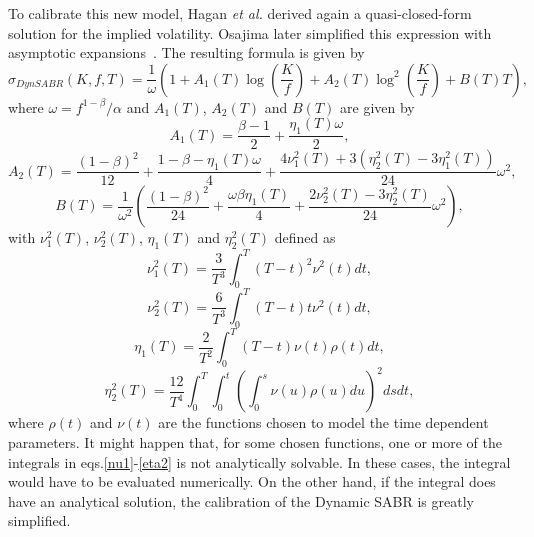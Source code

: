 To calibrate this new model, Hagan \textit{et al.} derived again a quasi-closed-form solution for the implied volatility. Osajima later simplified this expression with asymptotic expansions~\cite{Osajima}. The resulting formula is given by
\begin{equation}
\sigma_{DynSABR}(K,f,T)=\frac{1}{\omega}\left(1+A_1(T)\log\left(\frac{K}{f}\right)+A_2(T)\log^2\left(\frac{K}{f}\right)+B(T)T\right),
\end{equation}
\noindent where $\omega=f^{1-\beta}/\alpha$ and $A_1(T)$, $A_2(T)$ and $B(T)$ are given by
\begin{equation}
A_1(T)=\frac{\beta-1}{2}+\frac{\eta_1(T)\omega}{2},
\end{equation}
\begin{equation}
A_2(T)=\frac{(1-\beta)^2}{12}+\frac{1-\beta-\eta_1(T)\omega}{4}+\frac{4\nu_1^2(T)+3(\eta_2^2(T)-3\eta_1^2(T))}{24}\omega^2,
\end{equation}
\begin{equation}
B(T)=\frac{1}{\omega^2}\left(\frac{(1-\beta)^2}{24}+\frac{\omega\beta\eta_1(T)}{4}+\frac{2\nu_2^2(T)-3\eta_2^2(T)}{24}\omega^2\right),
\end{equation}
\noindent with $\nu_1^2(T)$, $\nu_2^2(T)$, $\eta_1(T)$ and $\eta_2^2(T)$ defined as
\begin{equation}\label{nu1}
\nu_1^2(T)=\frac{3}{T^3}\int_0^T(T-t)^2\nu^2(t)dt,
\end{equation}
\begin{equation}
\nu_2^2(T)=\frac{6}{T^3}\int_0^T(T-t)t\nu^2(t)dt,
\end{equation}
\begin{equation}
\eta_1(T)=\frac{2}{T^2}\int_0^T(T-t)\nu(t)\rho(t)dt,
\end{equation}
\begin{equation}\label{eta2}
\eta_2^2(T)=\frac{12}{T^4}\int_0^T\int_0^t\left(\int_0^s\nu(u)\rho(u)du\right)^2dsdt,
\end{equation}
\noindent where $\rho(t)$ and $\nu(t)$ are the functions chosen to model the time dependent parameters.
It might happen that, for some chosen functions, one or more of the integrals in eqs.\eqref{nu1}-\eqref{eta2} is not analytically  solvable. In these cases, the integral would have to be evaluated numerically. On the other hand, if the integral does have an analytical solution, the calibration of the Dynamic SABR is greatly simplified.


